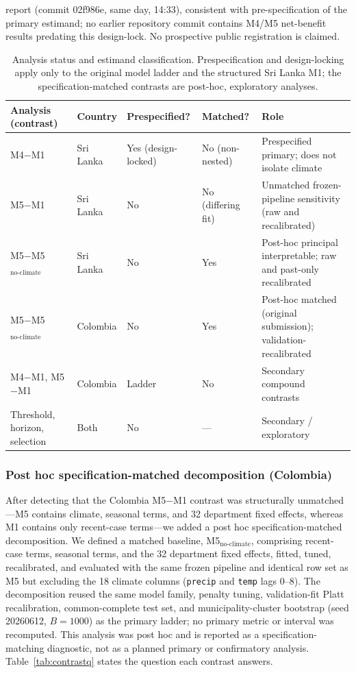 \documentclass[11pt,a4paper]{article}
\begin{document}
report (commit 02f986e, same day, 14:33), consistent with pre-specification of the primary estimand; no earlier repository commit contains M4/M5 net-benefit results predating this design-lock. No prospective public registration is claimed.

\begin{table}[htbp]
\centering
\caption{Analysis status and estimand classification. Prespecification and design-locking apply only to the original model ladder and the structured Sri Lanka M1; the specification-matched contrasts are post-hoc, exploratory analyses.}
\label{tab:analysisstatus}
\footnotesize{}
\begin{tabular}{@{}p{3.1cm}llll@{}}
\toprule
Analysis (contrast) & Country & Prespecified? & Matched? & Role \\
\midrule
M4$-$M1 & Sri Lanka & Yes (design-locked) & No (non-nested) & Prespecified primary; does not isolate climate \\
M5$-$M1 & Sri Lanka & No & No (differing fit) & Unmatched frozen-pipeline sensitivity (raw and recalibrated) \\
M5$-$M5$_{\text{no-climate}}$ & Sri Lanka & No & Yes & Post-hoc principal interpretable; raw and past-only recalibrated \\
M5$-$M5$_{\text{no-climate}}$ & Colombia & No & Yes & Post-hoc matched (original submission); validation-recalibrated \\
M4$-$M1, M5$-$M1 & Colombia & Ladder & No & Secondary compound contrasts \\
Threshold, horizon, selection & Both & No & --- & Secondary / exploratory \\
\bottomrule
\end{tabular}
\end{table}

\subsubsection*{Post hoc specification-matched decomposition (Colombia)}
After detecting that the Colombia M5$-$M1 contrast was structurally unmatched---M5 contains climate, seasonal terms, and 32 department fixed effects, whereas M1 contains only recent-case terms---we added a post hoc specification-matched decomposition. We defined a matched baseline, M5$_{\text{no-climate}}$, comprising recent-case terms, seasonal terms, and the 32 department fixed effects, fitted, tuned, recalibrated, and evaluated with the same frozen pipeline and identical row set as M5 but excluding the 18 climate columns (\texttt{precip} and \texttt{temp} lags 0--8). The decomposition reused the same model family, penalty tuning, validation-fit Platt recalibration, common-complete test set, and municipality-cluster bootstrap (seed 20260612, $B=1000$) as the primary ladder; no primary metric or interval was recomputed. This analysis was post hoc and is reported as a specification-matching diagnostic, not as a planned primary or confirmatory analysis. Table~\ref{tab:contrastq} states the question each contrast answers.
\end{document}
